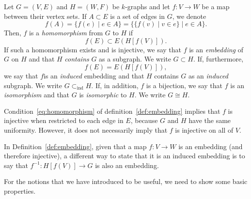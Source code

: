 \begin{definition} \label{def:embedding}
    Let $G = (V, E)$ and $H = (W, F)$ be $k$-graphs and let $f: V \to W$ be a map
    between their vertex sets.
    If $A \subset E$ is a set of edges in $G$, we denote
    \[
        f(A) = \{f(e) \mid e \in A\} = \{\{f(v) \mid v \in e\} \mid e \in A\}.
    \]
    Then, $f$ is a \emph{homomorphism} from $G$ to $H$ if
    \begin{equation}
        \label{eq:homomorphism}
        f(E) \subset E(H[f(V)]).
    \end{equation}
    If such a homomorphism exists
    and is injective, we say that $f$ is an \emph{embedding} of $G$ on $H$
    and that $H$ \emph{contains} $G$ as a subgraph.
    We write $G \subset H$.
    If, furthermore,
    \begin{equation}
        \label{eq:induced_embedding}
        f(E) = E(H[f(V)]),
    \end{equation}
    we say that $f$is an \emph{induced} embedding
    and that $H$ contains $G$ as an \emph{induced} subgraph.
    We write $G \subset_{\text{ind}} H$.
    If, in addition, $f$ is a bijection, we say that $f$ is an \emph{isomorphism}
    and that $G$ is \emph{isomorphic} to $H$.
    We write $G \cong H$.
\end{definition}

\begin{remark}
    Condition~\eqref{eq:homomorphism} of definition~\ref{def:embedding}
    implies that $f$ is injective
    when restricted to each edge in $E$, because $G$ and $H$ have the same uniformity.
    However, it does not necessarily imply that $f$ is injective on all of $V$.
\end{remark}

\begin{remark} \label{rem:inverse_embedding}
    In Definition~\ref{def:embedding}, given that a map $f: V \to W$ is an embedding
    (and therefore injective),
    a different way to state that it is an induced embedding is to say that
    $f^{-1}: H[f(V)] \to G$ is also an embedding.
\end{remark}

For the notions that we have introduced to be useful,
we need to show some basic properties.

